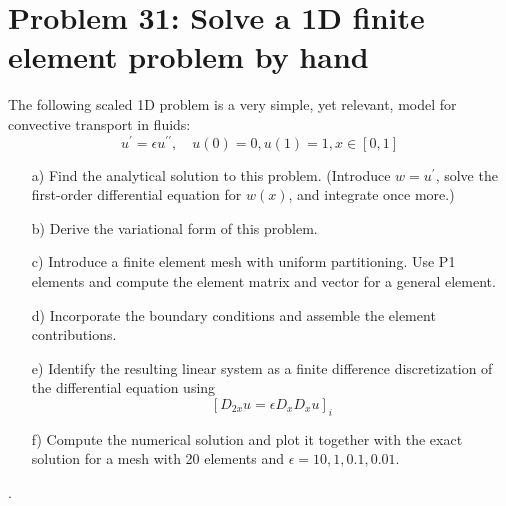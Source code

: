 \documentclass[../main.tex]{subfiles}
\begin{document}
	\section*{Problem 31: Solve a 1D finite element problem by hand}
		\noindent The following scaled 1D problem is a very simple, yet relevant, model for convective transport in fluids:
		\begin{equation}
			\label{309}
			u^{\prime}=\epsilon u^{\prime \prime}, \quad u(0)=0, u(1)=1, x \in[0,1]
		\end{equation}
		\begin{enumerate}
			\item[a)] Find the analytical solution to this problem. (Introduce $w=u^{\prime}$, solve the first-order differential equation for $w(x)$, and integrate once more.)
			\item [b)] Derive the variational form of this problem.
			\item[c)] Introduce a finite element mesh with uniform partitioning. Use P1 elements and compute the element matrix and vector for a general element.
			\item[d)] Incorporate the boundary conditions and assemble the element contributions.
			\item[e)] Identify the resulting linear system as a finite difference discretization of the differential equation using
			$$	\left[D_{2 x} u=\epsilon D_{x} D_{x} u\right]_{i} $$
			\item[f)] Compute the numerical solution and plot it together with the exact solution for a mesh with 20 elements and $\epsilon=10,1,0.1,0.01$.
		\end{enumerate}
		.\bigbreak 
\end{document}
